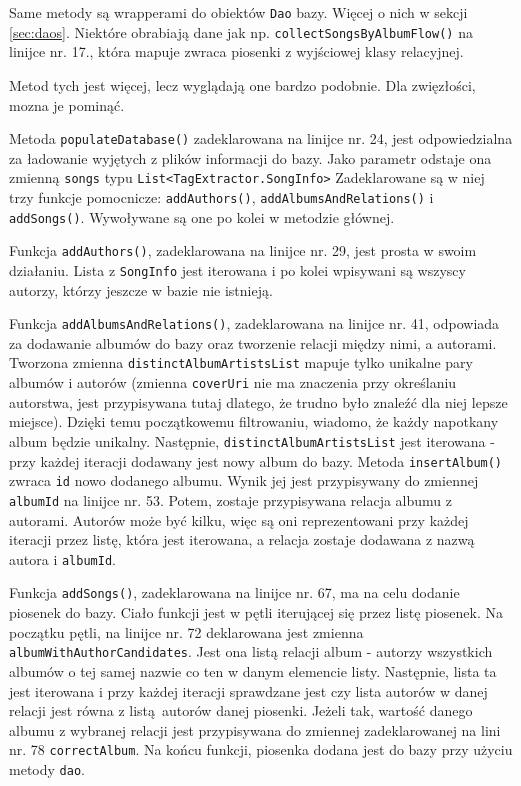 Same metody są wrapperami do obiektów \texttt{Dao} bazy. Więcej o nich w sekcji \ref{sec:daos}. Niektóre obrabiają dane jak np. \texttt{collectSongsByAlbumFlow()} na linijce nr. 17., która mapuje zwraca piosenki z wyjściowej klasy relacyjnej.

Metod tych jest więcej, lecz wyglądają one bardzo podobnie. Dla zwięzłości, mozna je pominąć.

Metoda \texttt{populateDatabase()} zadeklarowana na linijce nr. 24, jest odpowiedzialna za ładowanie wyjętych z plików informacji do bazy. Jako parametr odstaje ona zmienną \texttt{songs} typu \texttt{List<TagExtractor.SongInfo>}   Zadeklarowane są w niej trzy funkcje pomocnicze: \texttt{addAuthors()}, \texttt{addAlbumsAndRelations()} i \texttt{addSongs()}. Wywoływane są one po kolei w metodzie głównej.

Funkcja \texttt{addAuthors()}, zadeklarowana na linijce nr. 29, jest prosta w swoim działaniu. Lista z \texttt{SongInfo} jest iterowana i po kolei wpisywani są wszyscy autorzy, którzy jeszcze w bazie nie istnieją.

Funkcja \texttt{addAlbumsAndRelations()}, zadeklarowana na linijce nr. 41, odpowiada za dodawanie albumów do bazy oraz tworzenie relacji między nimi, a autorami. Tworzona zmienna \texttt{distinctAlbumArtistsList} mapuje tylko unikalne pary albumów i autorów (zmienna \texttt{coverUri} nie ma znaczenia przy określaniu autorstwa, jest przypisywana tutaj dlatego, że trudno było znaleźć dla niej lepsze miejsce). Dzięki temu początkowemu filtrowaniu, wiadomo, że każdy napotkany album będzie unikalny. Następnie, \texttt{distinctAlbumArtistsList} jest iterowana - przy każdej iteracji dodawany jest nowy album do bazy. Metoda \texttt{insertAlbum()} zwraca \texttt{id} nowo dodanego albumu. Wynik jej jest przypisywany do zmiennej \texttt{albumId} na linijce nr. 53. Potem, zostaje przypisywana relacja albumu z autorami. Autorów może być kilku, więc są oni reprezentowani przy każdej iteracji przez listę, która jest iterowana, a relacja zostaje dodawana z nazwą autora i \texttt{albumId}.

Funkcja \texttt{addSongs()}, zadeklarowana na linijce nr. 67, ma na celu dodanie piosenek do bazy. Ciało funkcji jest w pętli iterującej się przez listę piosenek. Na początku pętli, na linijce nr. 72 deklarowana jest zmienna \texttt{albumWithAuthorCandidates}. Jest ona listą relacji album - autorzy wszystkich albumów o tej samej nazwie co ten w danym elemencie listy. Następnie, lista ta jest iterowana i przy każdej iteracji sprawdzane jest czy lista autorów w danej relacji jest równa z listą autorów danej piosenki. Jeżeli tak, wartość danego albumu z wybranej relacji jest przypisywana do zmiennej zadeklarowanej na lini nr. 78 \texttt{correctAlbum}. Na końcu funkcji, piosenka dodana jest do bazy przy użyciu metody \texttt{dao}.

